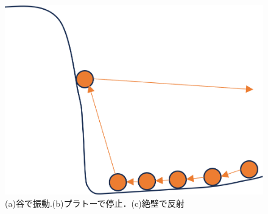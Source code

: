 \documentclass[a4paper,11pt]{jsreport}
\begin{document}
\begin{figure}[htbp]
\begin{minipage}[b]{0.3\linewidth}
    \subcaption{}
  \end{minipage}
  \begin{minipage}[b]{0.3\linewidth}
    \centering
    \includegraphics[keepaspectratio, scale=0.5]{image/勾配法課題(c)}
    \subcaption{}
  \end{minipage}
  \caption{(a)谷で振動.(b)プラトーで停止．(c)絶壁で反射}
  \label{勾配法の課題}
\end{figure}
\end{document}
